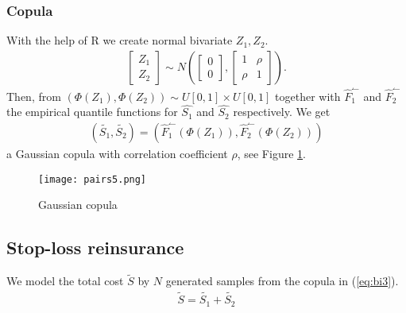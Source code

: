 \documentclass[11pt]{article}
\begin{document}
\subsubsection*{Copula}
With the help of R 
we create normal bivariate $Z_1,Z_2$.
\begin{align} \label{eq:bi1}
	 \begin{bmatrix} Z_1 \\ Z_2\end{bmatrix} \sim N\left(\begin{bmatrix} 0 \\ 0\end{bmatrix},\begin{bmatrix} 1&\rho \\ \rho&1\end{bmatrix}\right).
\end{align}
Then, from $\left(\Phi(Z_1),\Phi(Z_2)\right) \sim  U[0,1] \times U[0,1]$ 
together with $\hat{F}_1^\leftharpoonup$ and $\hat{F}_2^\leftharpoonup$ the empirical quantile functions for $\hat{S_1}$ and $\hat{S_2}$ respectively.
We get
\begin{align} \label{eq:bi3}
	  \left(\tilde{S_1},\tilde{S_2}\right) = \left(\hat{F}_1^\leftharpoonup(\Phi(Z_1)),\hat{F}_2^\leftharpoonup(\Phi(Z_2))\right) 
\end{align}
a Gaussian copula with correlation coefficient $ \rho$, see Figure \ref{fig:copula}.

 \begin{figure}[h]
 \center
  \texttt{[image: pairs5.png]}
  \caption{Gaussian copula}
  \label{fig:copula}
\end{figure}



\subsection*{Stop-loss reinsurance}
We model the total cost $\tilde{S}$ by $N$ generated samples from the copula in (\ref{eq:bi3}).
\begin{align*} 
	\tilde{S}= \tilde{S_1} + \tilde{S_2}
\end{align*}
\end{document}
